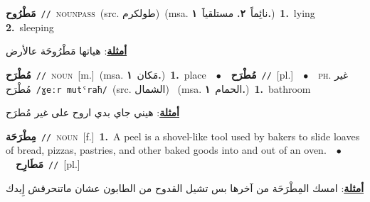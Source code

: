 \documentclass[10pt,a4paper,twoside]{article} %
\begin{document}
\begin{multicols}{2}
{\setlength\topsep{0pt}\textbf{\foreignlanguage{arabic}{مَطْرُوح}}\ {\color{gray}\texttt{//}\color{black}}\ \textsc{noun\textunderscore pass}\ (src. \color{gray}\foreignlanguage{arabic}{طولكرم}\color{black})\ \color{gray}(msa. \foreignlanguage{arabic}{نائِماً}~\foreignlanguage{arabic}{\textbf{٢.}}  \foreignlanguage{arabic}{مستلقياََ}~\foreignlanguage{arabic}{\textbf{١.}})\color{black}\ \textbf{1.}~lying  \textbf{2.}~sleeping\  \begin{flushright}\color{gray}\foreignlanguage{arabic}{\textbf{\underline{\foreignlanguage{arabic}{أمثلة}}}: هياتها مَطْرُوحَة عالأرض}\end{flushright}\color{black}} \vspace{2mm}

{\setlength\topsep{0pt}\textbf{\foreignlanguage{arabic}{مُطْرَح}}\ {\color{gray}\texttt{//}\color{black}}\ \textsc{noun}\ [m.]\ \color{gray}(msa. \foreignlanguage{arabic}{مَكان}~\foreignlanguage{arabic}{\textbf{١.}})\color{black}\ \textbf{1.}~place\ \ $\bullet$\ \ \setlength\topsep{0pt}\textbf{\foreignlanguage{arabic}{مُطْرَح}}\ {\color{gray}\texttt{//}\color{black}}\ [pl.]\ \ $\bullet$\ \ \textsc{ph.} \color{gray} \foreignlanguage{arabic}{غير مُطْرَح}\color{black}\ {\color{gray}\texttt{/{\sffamily ɣeːr mutˤraħ}/}\color{black}}\ \color{gray}(src. \foreignlanguage{arabic}{الشمال})\color{black}\ \color{gray} (msa. \foreignlanguage{arabic}{الحمام}~\foreignlanguage{arabic}{\textbf{١.}})\color{black}\ \textbf{1.}~bathroom\  \begin{flushright}\color{gray}\foreignlanguage{arabic}{\textbf{\underline{\foreignlanguage{arabic}{أمثلة}}}: هيني جاي بدي اروح على غير مُطرَح}\end{flushright}\color{black}} \vspace{2mm}

{\setlength\topsep{0pt}\textbf{\foreignlanguage{arabic}{مِطْرَحَة}}\ {\color{gray}\texttt{//}\color{black}}\ \textsc{noun}\ [f.]\ \textbf{1.}~A peel is a shovel-like tool used by bakers to slide loaves of bread, pizzas, pastries, and other baked goods into and out of an oven.\ \ $\bullet$\ \ \setlength\topsep{0pt}\textbf{\foreignlanguage{arabic}{مَطَارِح}}\ {\color{gray}\texttt{//}\color{black}}\ [pl.]\  \begin{flushright}\color{gray}\foreignlanguage{arabic}{\textbf{\underline{\foreignlanguage{arabic}{أمثلة}}}: امسك المِطْرَحَة من آخرها بس تشيل القدوح من الطابون عشان ماتنحرقش إِيدك}\end{flushright}\color{black}} \vspace{2mm}


\end{multicols}
\end{document}
